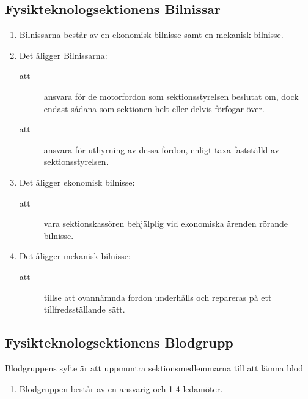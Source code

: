 \documentclass[11pt,a4paper]{article}
\begin{document}
\subsection{Fysikteknologsektionens Bilnissar}

\begin{enumerate}[\thesubsection .1]

  \item Bilnissarna består av en ekonomisk bilnisse samt en mekanisk
  bilnisse.

  \item Det åligger Bilnissarna:
    \begin{description}
      \item[att] ansvara för de motorfordon som sektionsstyrelsen
      beslutat om, dock endast sådana som sektionen helt eller delvis
      förfogar över.
      \item[att] ansvara för uthyrning av dessa fordon, enligt taxa
      fastställd av sektionsstyrelsen.
    \end{description}

  \item Det åligger ekonomisk bilnisse:
    \begin{description}
      \item[att] vara sektionskassören behjälplig vid ekonomiska
      ärenden rör\-an\-de bilnisse.
    \end{description}

  \item Det åligger mekanisk bilnisse:
    \begin{description}
      \item[att] tillse att ovannämnda fordon underhålls och repareras
      på ett tillfredsställande sätt.
    \end{description}

\end{enumerate}

\subsection{Fysikteknologsektionens Blodgrupp}
Blodgruppens syfte är att uppmuntra sektionsmedlemmarna till att lämna blod
\begin{enumerate}[\thesubsection .1]


  \item Blodgruppen består av en ansvarig och 1-4 ledamöter.

\end{enumerate}
\end{document}
